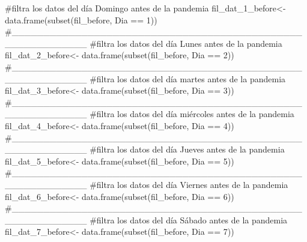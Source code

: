 \documentclass[
  us-letterpaper,
]{scrreprt}
\newenvironment{Shaded}{\begin{snugshade}}{\end{snugshade}}
\newcommand{\CommentTok}[1]{\textcolor[rgb]{0.37,0.37,0.37}{#1}}
\newcommand{\DecValTok}[1]{\textcolor[rgb]{0.68,0.00,0.00}{#1}}
\newcommand{\FunctionTok}[1]{\textcolor[rgb]{0.28,0.35,0.67}{#1}}
\newcommand{\NormalTok}[1]{\textcolor[rgb]{0.00,0.23,0.31}{#1}}
\newcommand{\OtherTok}[1]{\textcolor[rgb]{0.00,0.23,0.31}{#1}}
\newcommand{\SpecialCharTok}[1]{\textcolor[rgb]{0.37,0.37,0.37}{#1}}
\theoremstyle{plain}
\theoremstyle{plain}
\theoremstyle{definition}
\theoremstyle{remark}
\begin{document}
\begin{Shaded}
\begin{Highlighting}[]
\CommentTok{\#filtra los datos del día Domingo antes de la pandemia}
\NormalTok{fil\_dat\_1\_before}\OtherTok{\textless{}{-}} \FunctionTok{data.frame}\NormalTok{(}\FunctionTok{subset}\NormalTok{(fil\_before, Dia }\SpecialCharTok{==} \DecValTok{1}\NormalTok{))}
\CommentTok{\#\_\_\_\_\_\_\_\_\_\_\_\_\_\_\_\_\_\_\_\_\_\_\_\_\_\_\_\_\_\_\_\_\_\_\_\_\_\_\_\_\_\_\_\_\_\_\_\_\_\_\_\_\_\_\_\_\_\_\_}
\CommentTok{\#filtra los datos del día Lunes antes de la pandemia}
\NormalTok{fil\_dat\_2\_before}\OtherTok{\textless{}{-}} \FunctionTok{data.frame}\NormalTok{(}\FunctionTok{subset}\NormalTok{(fil\_before, Dia }\SpecialCharTok{==} \DecValTok{2}\NormalTok{))}
\CommentTok{\#\_\_\_\_\_\_\_\_\_\_\_\_\_\_\_\_\_\_\_\_\_\_\_\_\_\_\_\_\_\_\_\_\_\_\_\_\_\_\_\_\_\_\_\_\_\_\_\_\_\_\_\_\_\_\_\_\_\_\_}
\CommentTok{\#filtra los datos del día martes antes de la pandemia}
\NormalTok{fil\_dat\_3\_before}\OtherTok{\textless{}{-}} \FunctionTok{data.frame}\NormalTok{(}\FunctionTok{subset}\NormalTok{(fil\_before, Dia }\SpecialCharTok{==} \DecValTok{3}\NormalTok{))}
\CommentTok{\#\_\_\_\_\_\_\_\_\_\_\_\_\_\_\_\_\_\_\_\_\_\_\_\_\_\_\_\_\_\_\_\_\_\_\_\_\_\_\_\_\_\_\_\_\_\_\_\_\_\_\_\_\_\_\_\_\_\_\_}
\CommentTok{\#filtra los datos del día miércoles antes de la pandemia}
\NormalTok{fil\_dat\_4\_before}\OtherTok{\textless{}{-}} \FunctionTok{data.frame}\NormalTok{(}\FunctionTok{subset}\NormalTok{(fil\_before, Dia }\SpecialCharTok{==} \DecValTok{4}\NormalTok{))}
\CommentTok{\#\_\_\_\_\_\_\_\_\_\_\_\_\_\_\_\_\_\_\_\_\_\_\_\_\_\_\_\_\_\_\_\_\_\_\_\_\_\_\_\_\_\_\_\_\_\_\_\_\_\_\_\_\_\_\_\_\_\_\_}
\CommentTok{\#filtra los datos del día Jueves antes de la pandemia}
\NormalTok{fil\_dat\_5\_before}\OtherTok{\textless{}{-}} \FunctionTok{data.frame}\NormalTok{(}\FunctionTok{subset}\NormalTok{(fil\_before, Dia }\SpecialCharTok{==} \DecValTok{5}\NormalTok{))}
\CommentTok{\#\_\_\_\_\_\_\_\_\_\_\_\_\_\_\_\_\_\_\_\_\_\_\_\_\_\_\_\_\_\_\_\_\_\_\_\_\_\_\_\_\_\_\_\_\_\_\_\_\_\_\_\_\_\_\_\_\_\_\_}
\CommentTok{\#filtra los datos del día Viernes antes de la pandemia}
\NormalTok{fil\_dat\_6\_before}\OtherTok{\textless{}{-}} \FunctionTok{data.frame}\NormalTok{(}\FunctionTok{subset}\NormalTok{(fil\_before, Dia }\SpecialCharTok{==} \DecValTok{6}\NormalTok{))}
\CommentTok{\#\_\_\_\_\_\_\_\_\_\_\_\_\_\_\_\_\_\_\_\_\_\_\_\_\_\_\_\_\_\_\_\_\_\_\_\_\_\_\_\_\_\_\_\_\_\_\_\_\_\_\_\_\_\_\_\_\_\_\_}
\CommentTok{\#filtra los datos del día Sábado antes de la pandemia}
\NormalTok{fil\_dat\_7\_before}\OtherTok{\textless{}{-}} \FunctionTok{data.frame}\NormalTok{(}\FunctionTok{subset}\NormalTok{(fil\_before, Dia }\SpecialCharTok{==} \DecValTok{7}\NormalTok{))}
\end{Highlighting}
\end{Shaded}
\end{document}
